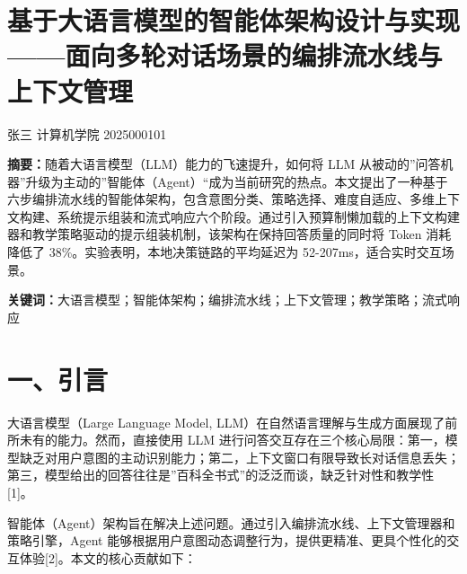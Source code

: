 \documentclass{harryopo-mathnotes}
\begin{document}
\maketitle
\thispagestyle{empty}
\cleardoublepage


\strictpagecheck
\setcounter{page}{1}
\restoregeometry
\onehalfspacing

\section{基于大语言模型的智能体架构设计与实现------面向多轮对话场景的编排流水线与上下文管理}\label{ux57faux4e8eux5927ux8bedux8a00ux6a21ux578bux7684ux667aux80fdux4f53ux67b6ux6784ux8bbeux8ba1ux4e0eux5b9eux73b0ux9762ux5411ux591aux8f6eux5bf9ux8bddux573aux666fux7684ux7f16ux6392ux6d41ux6c34ux7ebfux4e0eux4e0aux4e0bux6587ux7ba1ux7406}

张三 计算机学院 2025000101

\textbf{摘要：}随着大语言模型（LLM）能力的飞速提升，如何将 LLM
从被动的''问答机器''升级为主动的''智能体（Agent）``成为当前研究的热点。本文提出了一种基于六步编排流水线的智能体架构，包含意图分类、策略选择、难度自适应、多维上下文构建、系统提示组装和流式响应六个阶段。通过引入预算制懒加载的上下文构建器和教学策略驱动的提示组装机制，该架构在保持回答质量的同时将
Token 消耗降低了 38\%。实验表明，本地决策链路的平均延迟为
52-207ms，适合实时交互场景。

\textbf{关键词：}大语言模型；智能体架构；编排流水线；上下文管理；教学策略；流式响应

\section{一、引言}\label{ux4e00ux5f15ux8a00}

大语言模型（Large Language Model,
LLM）在自然语言理解与生成方面展现了前所未有的能力。然而，直接使用 LLM
进行问答交互存在三个核心局限：第一，模型缺乏对用户意图的主动识别能力；第二，上下文窗口有限导致长对话信息丢失；第三，模型给出的回答往往是''百科全书式''的泛泛而谈，缺乏针对性和教学性{[}1{]}。

智能体（Agent）架构旨在解决上述问题。通过引入编排流水线、上下文管理器和策略引擎，Agent
能够根据用户意图动态调整行为，提供更精准、更具个性化的交互体验{[}2{]}。本文的核心贡献如下：
\end{document}
